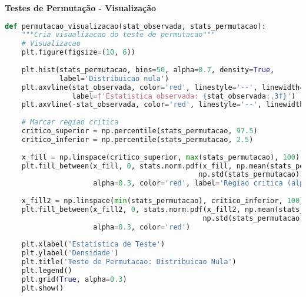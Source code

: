 \begin{examplebox}
\textbf{Testes de Permutação - Visualização}

\begin{lstlisting}[language=Python]
def permutacao_visualizacao(stat_observada, stats_permutacao):
    """Cria visualizacao do teste de permutacao"""
    # Visualizacao
    plt.figure(figsize=(10, 6))
    
    plt.hist(stats_permutacao, bins=50, alpha=0.7, density=True, 
             label='Distribuicao nula')
    plt.axvline(stat_observada, color='red', linestyle='--', linewidth=2,
                label=f'Estatistica observada: {stat_observada:.3f}')
    plt.axvline(-stat_observada, color='red', linestyle='--', linewidth=2, alpha=0.7)
    
    # Marcar regiao critica
    critico_superior = np.percentile(stats_permutacao, 97.5)
    critico_inferior = np.percentile(stats_permutacao, 2.5)
    
    x_fill = np.linspace(critico_superior, max(stats_permutacao), 100)
    plt.fill_between(x_fill, 0, stats.norm.pdf(x_fill, np.mean(stats_permutacao), 
                                              np.std(stats_permutacao)), 
                     alpha=0.3, color='red', label='Regiao critica (alpha=0.05)')
    
    x_fill2 = np.linspace(min(stats_permutacao), critico_inferior, 100)
    plt.fill_between(x_fill2, 0, stats.norm.pdf(x_fill2, np.mean(stats_permutacao), 
                                               np.std(stats_permutacao)), 
                     alpha=0.3, color='red')
    
    plt.xlabel('Estatistica de Teste')
    plt.ylabel('Densidade')
    plt.title('Teste de Permutacao: Distribuicao Nula')
    plt.legend()
    plt.grid(True, alpha=0.3)
    plt.show()

\end{lstlisting}
\end{examplebox}

